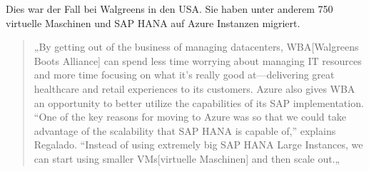 
Dies war der Fall bei Walgreens in den USA.
Sie haben unter anderem 750 virtuelle Maschinen und SAP HANA auf Azure Instanzen migriert.

\begin{quote}
      „By getting out of the business of managing datacenters, WBA[Walgreens Boots Alliance] can spend less time worrying about managing IT resources and more time focusing on what it’s really good at—delivering great healthcare and retail experiences to its customers. Azure also gives WBA an opportunity to better utilize the capabilities of its SAP implementation. “One of the key reasons for moving to Azure was so that we could take advantage of the scalability that SAP HANA is capable of,” explains Regalado. “Instead of using extremely big SAP HANA Large Instances, we can start using smaller VMs[virtuelle Maschinen] and then scale out.„
          
            {\cite{AZU01}}
\end{quote}

